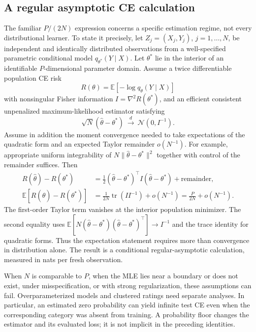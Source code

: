 \documentclass[11pt,letterpaper]{article}
\newcommand{\E}{\mathbb{E}}
\begin{document}
\subsection{A regular asymptotic CE calculation}
The familiar $P/(2N)$ expression concerns a specific estimation regime, not every distributional learner.
To state it precisely, let $Z_j=(X_j,Y_j)$, $j=1,\ldots,N$, be independent and identically distributed observations from a well-specified parametric conditional model $q_{\theta^\ast}(Y\mid X)$.
Let $\theta^\ast$ lie in the interior of an identifiable $P$-dimensional parameter domain.
Assume a twice differentiable population CE risk
\[
 R(\theta)=\E[-\log q_\theta(Y\mid X)]
\]
with nonsingular Fisher information $I=\nabla^2R(\theta^\ast)$, and an efficient consistent unpenalized maximum-likelihood estimator satisfying
\[
 \sqrt N(\widehat\theta-\theta^\ast)\ \xrightarrow{d}\ \mathcal N(0,I^{-1}).
\]
Assume in addition the moment convergence needed to take expectations of the quadratic form and an expected Taylor remainder $o(N^{-1})$.
For example, appropriate uniform integrability of $N\|\widehat\theta-\theta^\ast\|^2$ together with control of the remainder suffices.
Then
\begin{align}
 R(\widehat\theta)-R(\theta^\ast)
 &=\tfrac12(\widehat\theta-\theta^\ast)^\top I(\widehat\theta-\theta^\ast)+\text{remainder},\\
 \E[R(\widehat\theta)-R(\theta^\ast)]
 &=\frac1{2N}\operatorname{tr}(II^{-1})+o(N^{-1})
 =\frac{P}{2N}+o(N^{-1}).\label{eq:asymptotic}
\end{align}
The first-order Taylor term vanishes at the interior population minimizer.
The second equality uses $\E[N(\widehat\theta-\theta^\ast)(\widehat\theta-\theta^\ast)^\top]\to I^{-1}$ and the trace identity for quadratic forms.
Thus the expectation statement requires more than convergence in distribution alone.
The result is a conditional regular-asymptotic calculation, measured in nats per fresh observation.

When $N$ is comparable to $P$, when the MLE lies near a boundary or does not exist, under misspecification, or with strong regularization, these assumptions can fail.
Overparameterized models and clustered ratings need separate analyses.
In particular, an estimated zero probability can yield infinite test CE even when the corresponding category was absent from training.
A probability floor changes the estimator and its evaluated loss; it is not implicit in the preceding identities.
\end{document}
